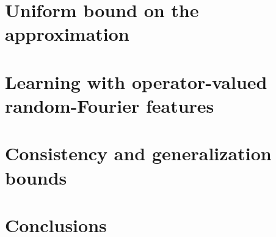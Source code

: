 \section{Uniform bound on the approximation}
\label{sec:uniform_bound_on_the_approximation}

\section{Learning with operator-valued random-Fourier features}
\label{sec:learning_with_operator-valued_random-fourier_features}

\section{Consistency and generalization bounds}
\label{sec:consistency and generalization bounds}

\section{Conclusions}
\label{sec:conclusions}
